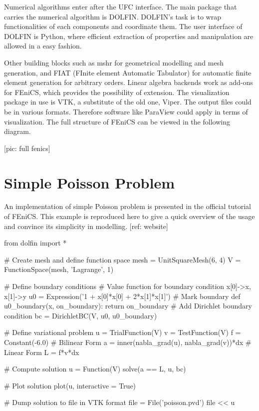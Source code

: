\documentclass[10pt,a4paper]{scrreprt}
\begin{document}
Numerical algorithms enter after the UFC interface. The main package that carries the numerical algorithm is DOLFIN. DOLFIN's task is to wrap functionalities of each components and coordinate them. The user interface of DOLFIN is Python, where efficient extraction of properties and manipulation are allowed in a easy fashion.  

Other building blocks such as mshr for geometrical modelling and mesh generation, and FIAT (FInite element Automatic Tabulator) for automatic finite element generation for arbitrary orders. Linear algebra backends work as add-ons for FEniCS, which provides the possibility of extension. The visualization package in use is VTK, a substitute of the old one, Viper. The output files could be in various formats. Therefore software like ParaView could apply in terms of visualization. The full structure of FEniCS can be viewed in the following diagram.

[pic: full fenics]

\section{Simple Poisson Problem}
An implementation of simple Poisson problem is presented in the official tutorial of FEniCS. This example is reproduced here to give a quick overview of the usage and convince its simplicity in modelling. [ref: website]

\begin{python}
from dolfin import *

# Create mesh and define function space
mesh = UnitSquareMesh(6, 4)
V = FunctionSpace(mesh, 'Lagrange', 1)

# Define boundary conditions
# Value function for boundary condition x[0]->x, x[1]->y
u0 = Expression('1 + x[0]*x[0] + 2*x[1]*x[1]')
# Mark boundary
def u0_boundary(x, on_boundary):
    return on_boundary
# Add Dirichlet boundary condition
bc = DirichletBC(V, u0, u0_boundary)

# Define variational problem
u = TrialFunction(V)
v = TestFunction(V)
f = Constant(-6.0)
# Bilinear Form
a = inner(nabla_grad(u), nabla_grad(v))*dx
# Linear Form
L = f*v*dx

# Compute solution
u = Function(V)
solve(a == L, u, bc)

# Plot solution
plot(u, interactive = True)

# Dump solution to file in VTK format
file = File('poisson.pvd')
file << u
\end{python}
\end{document}
